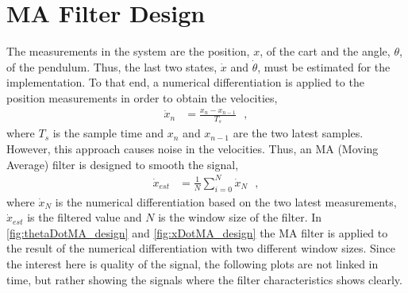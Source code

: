 \section{MA Filter Design}
The measurements in the system are the position, $x$, of the cart and the angle, $\theta$, of the pendulum. Thus, the last two states, $\dot{x}$ and $\dot{\theta}$, must be estimated for the implementation. To that end, a numerical differentiation is applied to the position measurements in order to obtain the velocities,
\begin{align}
  \dot{x}_n &= \frac{x_n - x_{n-1}}{T_{s}}   \ \ \ ,
  \label{eq:nummericalDiff}
\end{align}
where $T_s$ is the sample time and $x_n$ and $x_{n-1}$ are the two latest samples. However, this approach causes noise in the velocities. Thus, an MA (Moving Average) filter is designed to smooth the signal,
%
\begin{align}
  \dot{x}_{est} &= \frac{1}{N}\sum_{i=0}^{N} \dot{x}_N   \ \ \ ,
  \label{eq:MA}
\end{align}
%
where $\dot{x}_N$ is the numerical differentiation based on the two latest measurements, $\dot{x}_{est}$ is the filtered value and $N$ is the window size of the filter. In \autoref{fig:thetaDotMA_design} and \ref{fig:xDotMA_design} the MA filter is applied to the result of the numerical differentiation with two different window sizes. Since the interest here is quality of the signal, the following plots are not linked in time, but rather showing the signals where the filter characteristics shows clearly.
%
